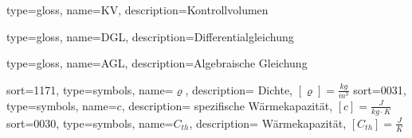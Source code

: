 
\makeglossaries

{
  type=gloss,
  name=KV,
  description={Kontrollvolumen}
}

{
  type=gloss,
  name=DGL,
  description={Differentialgleichung}
}

{
  type=gloss,
  name=AGL,
  description={Algebraische Gleichung}
}

{
  sort=1171,
  type=symbols,
  name={\ensuremath{\varrho}},
  description={
    Dichte, $[\varrho] = \frac{kg}{m^3}$
  }
}
{
  sort=0031,
  type=symbols,
  name={\ensuremath{c}},
  description={
    spezifische Wärmekapazität, $[c] = \frac{J}{kg\cdot K}$
  }
}
{
  sort=0030,
  type=symbols,
  name={\ensuremath{C_{th}}},
  description={
    Wärmekapazität, $[C_{th}] = \frac{J}{K}$
  }
}


